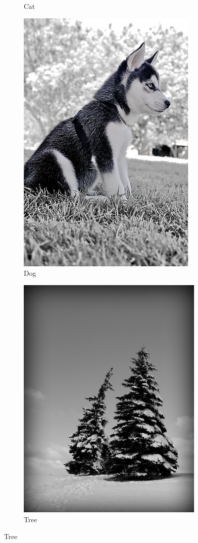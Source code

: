 \documentclass[pageno]{jpaper}
\begin{document}
\begin{figure}
\begin{subfigure}{.2\textwidth}
  \caption{Cat}
\end{subfigure}%
\begin{subfigure}{.2\textwidth}
  \centering
  \includegraphics[scale=0.1]{classTypeExample3.jpg}
  \caption{Dog}
\end{subfigure}%
\begin{subfigure}{.2\textwidth}
  \centering
  \includegraphics[scale=0.1]{classTypeExample4.jpg}
  \caption{Tree}
\end{subfigure}



\end{figure}
\end{document}
